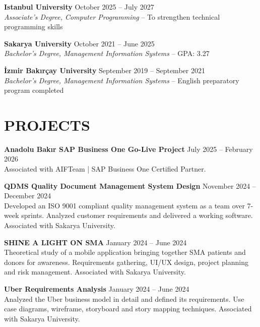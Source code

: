 \documentclass[a4paper,8pt]{article}
\begin{document}
\textbf{Istanbul University} \hfill {\small October 2025 -- July 2027}\\
{\small \textit{Associate's Degree, Computer Programming} -- To strengthen technical programming skills}

\vspace{3pt}

\textbf{Sakarya University} \hfill {\small October 2021 -- June 2025}\\
{\small \textit{Bachelor's Degree, Management Information Systems} -- GPA: 3.27}

\vspace{3pt}

\textbf{İzmir Bakırçay University} \hfill {\small September 2019 -- September 2021}\\
{\small \textit{Bachelor's Degree, Management Information Systems} -- English preparatory program completed}

\section{PROJECTS}

\textbf{Anadolu Bakır SAP Business One Go-Live Project} \hfill {\small July 2025 -- February 2026}\\
{\small Associated with AIFTeam | SAP Business One Certified Partner.}

\vspace{3pt}

\textbf{QDMS Quality Document Management System Design} \hfill {\small November 2024 -- December 2024}\\
{\small Developed an ISO 9001 compliant quality management system as a team over 7-week sprints. Analyzed customer requirements and delivered a working software. Associated with Sakarya University.}

\vspace{3pt}

\textbf{SHINE A LIGHT ON SMA} \hfill {\small January 2024 -- June 2024}\\
{\small Theoretical study of a mobile application bringing together SMA patients and donors for awareness. Requirements gathering, UI/UX design, project planning and risk management. Associated with Sakarya University.}

\vspace{3pt}

\textbf{Uber Requirements Analysis} \hfill {\small January 2024 -- June 2024}\\
{\small Analyzed the Uber business model in detail and defined its requirements. Use case diagrams, wireframe, storyboard and story mapping techniques. Associated with Sakarya University.}
\end{document}
